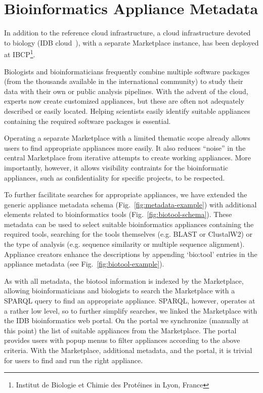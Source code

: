 \section{Bioinformatics Appliance Metadata}
\label{sec:bioinfo}

In addition to the reference cloud infrastructure, a cloud
infrastructure devoted to biology (IDB cloud~\cite{idbcloud}), with a
separate Marketplace instance, has been deployed at
IBCP\footnote{Institut de Biologie et Chimie des Prot\'eines in Lyon,
  France}.

Biologists and bioinformaticians frequently combine multiple software
packages (from the thousands available in the international community)
to study their data with their own or public analysis pipelines. With
the advent of the cloud, experts now create customized appliances, but
these are often not adequately described or easily located.  Helping
scientists easily identify suitable appliances containing the required
software packages is essential.

Operating a separate Marketplace with a limited thematic scope already
allows users to find appropriate appliances more easily.  It also
reduces ``noise'' in the central Marketplace from iterative attempts
to create working appliances.  More importantly, however, it allows
visibility contraints for the bioinformatic appliances, such as
confidentiality for specific projects, to be respected.

To further facilitate searches for appropriate appliances, we have
extended the generic appliance metadata schema
(Fig.~\ref{fig:metadata-example}) with additional elements related to
bioinformatics tools (Fig.~\ref{fig:biotool-schema})\@. These metadata
can be used to select suitable bioinformatics appliances containing
the required tools, searching for the tools themselves (e.g. BLAST or
ClustalW2) or the type of analysis (e.g. sequence similarity or
multiple sequence alignment).  Appliance creators enhance the
descriptions by appending `bio:tool' entries in the appliance metadata
(see Fig.~\ref{fig:biotool-example}).

As with all metadata, the biotool information is indexed by the
Marketplace, allowing bioinformaticians and biologists to search the
Marketplace with a SPARQL query to find an appropriate appliance.
SPARQL, however, operates at a rather low level, so to further
simplify searches, we linked the Marketplace with the IDB
bioinformatics web portal. On the portal we synchronize (manually at
this point) the list of suitable appliances from the Marketplace. The
portal provides users with popup menus to filter appliances according
to the above criteria.  With the Marketplace, additional metadata, and
the portal, it is trivial for users to find and run the right
appliance.


